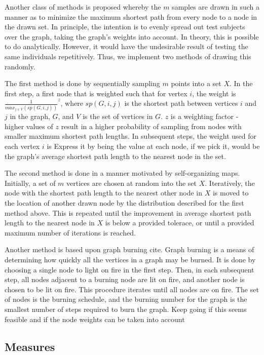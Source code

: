 \documentclass[fleqn,10pt]{SelfArx} %
\newcommand{\ed}[1]{{\color{blue} #1}}
\begin{document}
Another class of methods is proposed whereby the $m$ samples are drawn in such a manner as to minimize the maximum shortest path from every node to a node in the drawn set.  
In principle, the intention is to evenly spread out test subjects over the graph, taking the graph's weights into account.
In theory, this is possible to do analytically.  However, it would have the undesirable result of testing the same individuals repetitively.  Thus, we implement two methods of drawing this randomly.  

The first method is done by sequentially sampling $m$ points into a set $X$.  In the first step, a first node  that is weighted such that for vertex $i$, the weight is $\frac{1}{max_{j \in V}(sp(G, i,j))}^z$, where $sp(G,i,j)$ is the shortest path between vertices $i$ and $j$ in the graph, $G$, and $V$ is the set of vertices in $G$.  $z$ is a weighting factor - higher values of $z$ result in a higher probability of sampling from nodes with smaller maximum shortest path lengths.  In subsequent steps, the weight used for each vertex $i$ is \ed{Express it by being the value at each node, if we pick it, would be the graph's average shortest path length to the nearest node in the set}.

The second method is done in a manner motivated by self-organizing maps.  Initially, a set of $m$ vertices are chosen at random into the set $X$.  Iteratively, the node with the shortest path length to the nearest other node in $X$ is moved to the location of another drawn node by the distribution described for the first method above.  This is repeated until the improvement in average shortest path length to the nearest node in $X$ is below a provided tolerace, or until a provided maximum number of iterations is reached.

Another method is based upon graph burning \ed{cite}.  Graph burning is a means of determining how quickly all the vertices in a graph may be burned.  It is done by choosing a single node to light on fire in the first step.  Then, in each subsequent step, all nodes adjacent to a burning node are lit on fire, and another node is chosen to be lit on fire.  This procedure iterates until all nodes are on fire.  The set of nodes is the burning schedule, and the burning number for the graph is the smallest number of steps required to burn the graph.  \ed{Keep going if this seems feasible and if the node weights can be taken into account}

\subsection{Measures}
\end{document}
